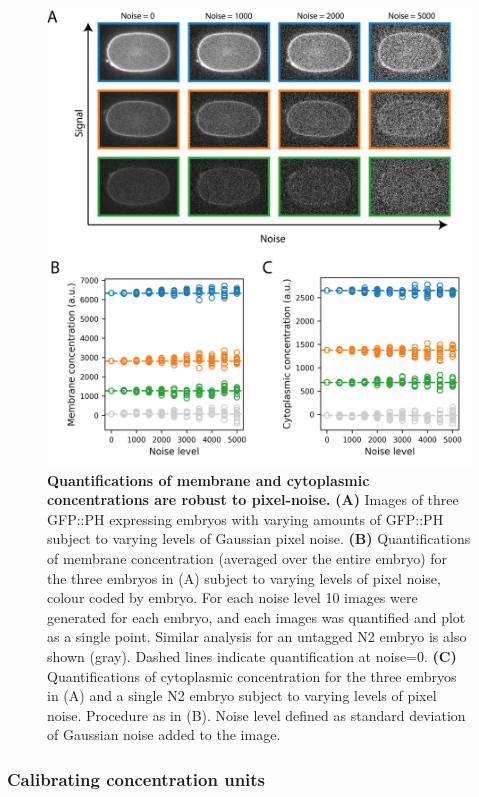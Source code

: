\documentclass[12pt]{"article"}
\newcommand{\mycaption}[2]{\caption[#1]{\textbf{#1.} #2}}
\begin{document}
\begin{figure}
\includegraphics[scale=0.95]{memquant_benchmarking_noise}
\centering
\mycaption{Quantifications of membrane and cytoplasmic concentrations are robust to pixel-noise}{
\textbf{(A)} Images of three GFP::PH expressing embryos with varying amounts of GFP::PH subject to varying levels of Gaussian pixel noise.
\textbf{(B)} Quantifications of membrane concentration (averaged over the entire embryo) for the three embryos in (A) subject to varying levels of pixel noise, colour coded by embryo. For each noise level 10 images were generated for each embryo, and each images was quantified and plot as a single point. Similar analysis for an untagged N2 embryo is also shown (gray). Dashed lines indicate quantification at noise=0.
\textbf{(C)} Quantifications of cytoplasmic concentration for the three embryos in (A) and a single N2 embryo subject to varying levels of pixel noise. Procedure as in (B). Noise level defined as standard deviation of Gaussian noise added to the image. 
}
\label{fig:memquant_benchmarking_noise}
\end{figure}


\subsubsection{Calibrating concentration units}
\end{document}
